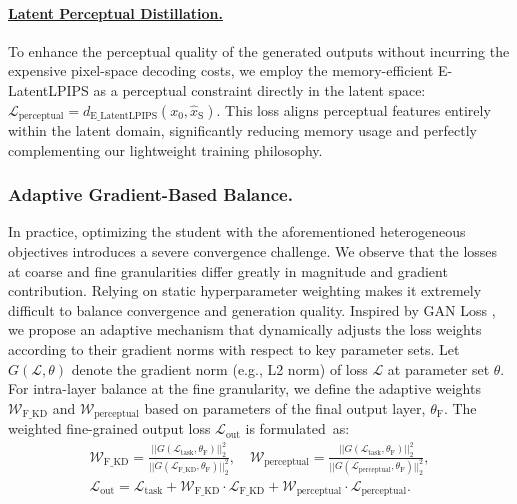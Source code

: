 \documentclass{llmxive}
\begin{document}
\paragraph{\underline{Latent Perceptual Distillation.}} 
To enhance the perceptual quality of the generated outputs without incurring the expensive pixel-space decoding costs, we employ the memory-efficient E-LatentLPIPS \cite{kang2024diffusion2gan} as a perceptual constraint directly in the latent space: $\mathcal{L}_\mathrm{perceptual} =  d_\mathrm{E\_LatentLPIPS}(x_0, \hat{x}_\mathrm{S})$.
This loss aligns perceptual features entirely within the latent domain, significantly reducing memory usage and perfectly complementing our lightweight training philosophy.

\vspace{-0.5em}
\subsubsection{Adaptive Gradient-Based Balance.}
In practice, optimizing the student with the aforementioned heterogeneous objectives introduces a severe convergence challenge. We observe that the losses at coarse and fine granularities differ greatly in magnitude and gradient contribution. Relying on static hyperparameter weighting makes it extremely difficult to balance convergence and generation quality.
Inspired by GAN Loss \cite{esser2021VQGAN}, we propose an adaptive mechanism that dynamically adjusts the loss weights according to their gradient norms with respect to key parameter sets. Let $G(\mathcal{L},\theta)$ denote the gradient norm (e.g., L2 norm) of loss $\mathcal{L}$ at parameter set $\theta$.
For intra-layer balance at the fine granularity, we define the adaptive weights $\mathcal{W}_{\text{F\_KD}}$ and $\mathcal{W}_{\text{perceptual}}$ based on parameters of the final output layer, $\theta_\text{F}$. The weighted fine-grained output loss $\mathcal{L}_{\text{out}}$ is formulated~as:
\begin{equation}
\begin{gathered}
\mathcal{W}_{\text{F\_KD}} =  \frac{||G(\mathcal{L}_{\text{task}}, \theta_\text{F})||^2_2}{||G(\mathcal{L}_{\text{F\_KD}}, \theta_\text{F})||^2_2}, \quad
\mathcal{W}_{\text{perceptual}} =  \frac{||G(\mathcal{L}_{\text{task}}, \theta_\text{F})||^2_2}{||G(\mathcal{L}_{\text{perceptual}}, \theta_\text{F})||^2_2}, \\
\mathcal{L}_{\text{out}} = \mathcal{L}_{\text{task}} + \mathcal{W}_{\text{F\_KD}} \cdot \mathcal{L}_{\text{F\_KD}}  + \mathcal{W}_{\text{perceptual}} \cdot \mathcal{L}_{\text{perceptual}}.
\end{gathered}
\end{equation}
\end{document}
